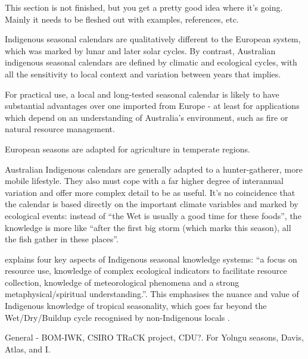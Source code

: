 This section is not finished, but you get a pretty good idea where it's
going.  Mainly it needs to be fleshed out with examples, references, etc.

Indigenous seasonal calendars are qualitatively different to the European
system, which was marked by lunar and later solar cycles.  By contrast,
Australian indigenous seasonal calendars are defined by climatic and ecological
cycles, with all the sensitivity to local context and variation between years
that implies.

For practical use, a local and long-tested seasonal calendar is likely to have
substantial advantages over one imported from Europe - at least for
applications which depend on an understanding of Australia's environment, such
as fire or natural resource management.

European seasons are adapted for agriculture in temperate regions.

Australian Indigenous calendars are generally adapted to a hunter-gatherer,
more mobile lifestyle.  They also must cope with a far higher degree of
interannual variation and offer more complex detail to be as useful.  It's no
coincidence that the calendar is based directly on the important climate
variables and marked by ecological events:  instead of ``the Wet is usually a
good time for these foods'', the knowledge is more like ``after the first big
storm (which marks this season), all the fish gather in these places''.

\citet{woodward2012b} explains four key aspects of Indigenous seasonal
knowledge systems: ``a focus on resource use, knowledge of complex
ecological indicators to facilitate resource collection, knowledge of
meteorological phenomena and a strong metaphysical/spiritual understanding.''.
This emphasises the nuance and value of Indigenous knowledge of tropical
seasonality, which goes far beyond the Wet/Dry/Buildup cycle recognised
by non-Indigenous locals \citep{willmett2009}.




General - BOM-IWK, CSIRO TRaCK project, CDU?.  For Yolngu seasons, Davis, Atlas, and I.

